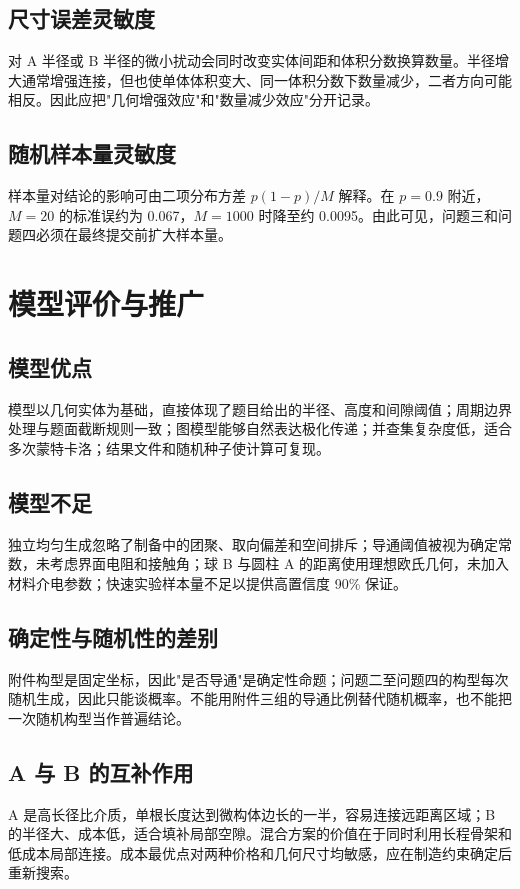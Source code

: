 \documentclass[12pt,a4paper,fontset=windows]{ctexart}
\begin{document}
\subsection{尺寸误差灵敏度}
对 A 半径或 B 半径的微小扰动会同时改变实体间距和体积分数换算数量。半径增大通常增强连接，但也使单体体积变大、同一体积分数下数量减少，二者方向可能相反。因此应把"几何增强效应"和"数量减少效应"分开记录。

\subsection{随机样本量灵敏度}
样本量对结论的影响可由二项分布方差 $p(1-p)/M$ 解释。在 $p=0.9$ 附近，$M=20$ 的标准误约为 0.067，$M=1000$ 时降至约 0.0095。由此可见，问题三和问题四必须在最终提交前扩大样本量。

\section{模型评价与推广}

\subsection{模型优点}
模型以几何实体为基础，直接体现了题目给出的半径、高度和间隙阈值；周期边界处理与题面截断规则一致；图模型能够自然表达极化传递；并查集复杂度低，适合多次蒙特卡洛；结果文件和随机种子使计算可复现。

\subsection{模型不足}
独立均匀生成忽略了制备中的团聚、取向偏差和空间排斥；导通阈值被视为确定常数，未考虑界面电阻和接触角；球 B 与圆柱 A 的距离使用理想欧氏几何，未加入材料介电参数；快速实验样本量不足以提供高置信度 90\% 保证。

\subsection{确定性与随机性的差别}
附件构型是固定坐标，因此"是否导通"是确定性命题；问题二至问题四的构型每次随机生成，因此只能谈概率。不能用附件三组的导通比例替代随机概率，也不能把一次随机构型当作普遍结论。

\subsection{A 与 B 的互补作用}
A 是高长径比介质，单根长度达到微构体边长的一半，容易连接远距离区域；B 的半径大、成本低，适合填补局部空隙。混合方案的价值在于同时利用长程骨架和低成本局部连接。成本最优点对两种价格和几何尺寸均敏感，应在制造约束确定后重新搜索。
\end{document}
